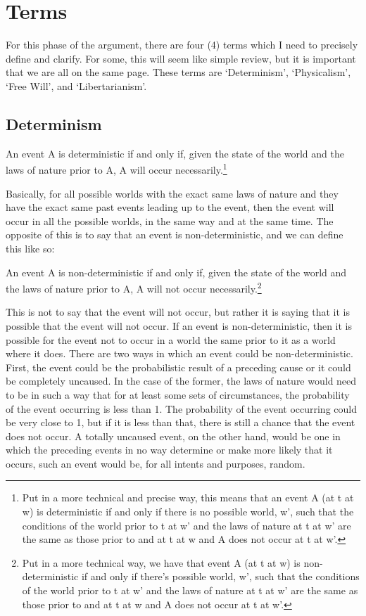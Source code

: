 \section{Terms}

For this phase of the argument, there are four (4) terms which I need to precisely define and clarify. For some, this will seem like simple review, but it is important that we are all on the same page. These terms are ‘Determinism', ‘Physicalism', ‘Free Will', and ‘Libertarianism'.
\subsection{Determinism}

\begin{center}An event A is deterministic if and only if, given the state of the world and the laws of nature prior to A, A will occur necessarily.\footnote{Put in a more technical and precise way, this means that an event A (at t at w) is deterministic if and only if there is no possible world, w’, such that the conditions of the world prior to t at w’ and the laws of nature at t at w’ are the same as those prior to and at t at w and A does not occur at t at w’.}
\end{center}
Basically, for all possible worlds with the exact same laws of nature and they have the exact same past events leading up to the event, then the event will occur in all the possible worlds, in the same way and at the same time. The opposite of this is to say that an event is non-deterministic, and we can define this like so:
\begin{center}
An event A is non-deterministic if and only if, given the state of the world and the laws of nature prior to A, A will not occur necessarily.\footnote{Put in a more technical way, we have that event A (at t at w) is non-deterministic if and only if there’s possible world, w’, such that the conditions of the world prior to t at w’ and the laws of nature at t at w’ are the same as those prior to and at t at w and A does not occur at t at w’.}
\end{center}
This is not to say that the event will not occur, but rather it is saying that it is possible that the event will not occur. If an event is non-deterministic, then it is possible for the event not to occur in a world the same prior to it as a world where it does. There are two ways in which an event could be non-deterministic. First, the event could be the probabilistic result of a preceding cause or it could be completely uncaused. In the case of the former, the laws of nature would need to be in such a way that for at least some sets of circumstances, the probability of the event occurring is less than 1. The probability of the event occurring could be very close to 1, but if it is less than that, there is still a chance that the event does not occur. A totally uncaused event, on the other hand, would be one in which the preceding events in no way determine or make more likely that it occurs, such an event would be, for all intents and purposes, random.

